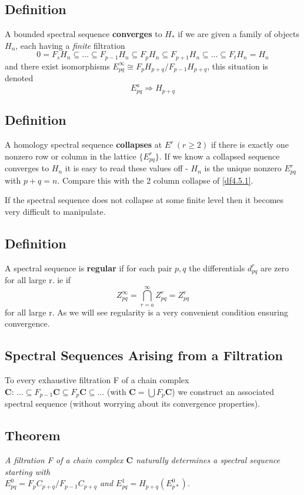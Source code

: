 \subsection*{Definition}
A bounded spectral sequence \textbf{converges} to $H_*$ if we are
given a family of objects $H_n$, each having a \textit{finite}
filtration
$$0=F_sH_n\subseteq\dots\subseteq F_{p-1}H_n\subseteq F_p
H_n\subseteq F_{p+1}H_n\subseteq\dots \subseteq F_t H_n = H_n$$
and there exist isomorphisms $E_{pq}^\infty \cong
F_pH_{p+q}/F_{p-1}H_{p+q}$, this situation is \\ denoted
$$E_{pq}^a \Longrightarrow H_{p+q}$$

\subsection*{Definition}
A homology spectral sequence \textbf{collapses} at $E^r\,(r\geq
2)$ if there is exactly one nonzero row or column in the lattice
$\{E^r_{pq}\}$. If we know a collapsed sequence converges to $H_n$
it is easy to read these values off - $H_n$ is the unique nonzero
$E^r_{pq}$ with $p+q = n$. Compare this with the 2 column collapse
of \ref{df4.5.1}.

If the spectral sequence does not collapse at some finite level
then it becomes very difficult to manipulate.

\subsection*{Definition}
A spectral sequence is \textbf{regular} if for each pair $p,q$ the
differentials $d^r_{pq}$ are zero for all large r. ie if
$$Z_{pq}^\infty = \bigcap_{r=a}^\infty Z^r_{pq}=Z_{pq}^r$$ for all
large r. As we will see regularity is a very convenient condition
ensuring convergence.



\subsection{Spectral Sequences Arising from a
Filtration}\label{df4.5.3}

To every exhaustive filtration F of a chain complex \\ $\mathbf
C$: $\dots\subseteq F_{p-1}\mathbf C\subseteq F_p\mathbf
C\subseteq \dots$ (with $\mathbf C=\bigcup F_p \mathbf C$) we
construct an associated spectral sequence (without worrying about
its convergence properties).

\subsection*{Theorem}
\emph{A filtration F of a chain complex $\mathbf C$ naturally
determines a spectral sequence starting with \\ $E^0_{pq}=
F_pC_{p+q}/F_{p-1}C_{p+q}$ and $E^1_{pq} = H_{p+q}(E^0_{p*})$.}

